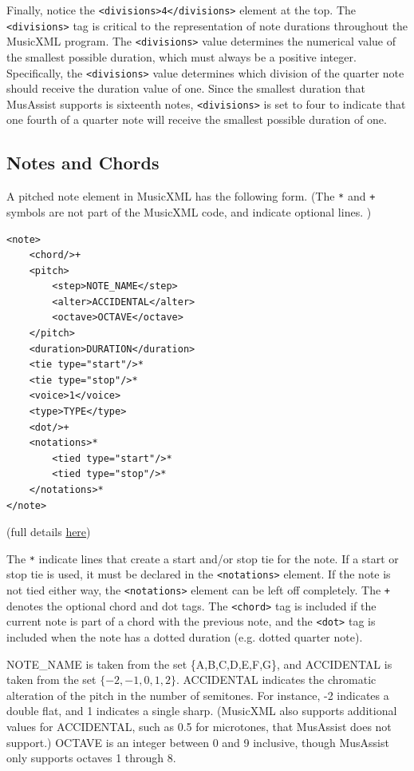 \documentclass{report}
\begin{document}
Finally, notice the \verb.<divisions>4</divisions>. element at the top. The \verb.<divisions>. tag is critical to the representation of note durations throughout the MusicXML program. The \verb.<divisions>. value determines the numerical value of the smallest possible duration, which must always be a positive integer. Specifically, the \verb.<divisions>. value determines which division of the quarter note should receive the duration value of one. Since the smallest duration that MusAssist supports is  sixteenth  notes, \verb.<divisions>. is set to four to indicate that one fourth of a quarter note will receive the smallest possible duration of one.

\subsection{Notes and Chords}
\label{sec:xmlnotes}
A pitched note element in MusicXML has the following form. (The \verb.*. and \verb.+. symbols are not part of the MusicXML code, and indicate optional lines. )

\begin{verbatim}
<note>
    <chord/>+
    <pitch>
        <step>NOTE_NAME</step>
        <alter>ACCIDENTAL</alter>
        <octave>OCTAVE</octave>
    </pitch>
    <duration>DURATION</duration>
    <tie type="start"/>*
    <tie type="stop"/>*
    <voice>1</voice>
    <type>TYPE</type>
    <dot/>+
    <notations>*
        <tied type="start"/>*
        <tied type="stop"/>*
    </notations>*
</note>
\end{verbatim}

\noindent (full details \href{https://www.w3.org/2021/06/musicxml40/musicxml-reference/elements/note/}{here})

The \verb.*. indicate lines that create a start and/or stop tie for the note. If a start or stop tie is used, it must be declared in the \verb.<notations>. element. If the note is not tied either way, the \verb.<notations>. element can be left off completely. The \verb.+. denotes the optional chord and dot tags. The \verb.<chord>. tag is included if the current note is part of a chord with the previous note, and the \verb.<dot>. tag is included when the note has a dotted duration (e.g. dotted quarter note).

NOTE\_NAME is taken from the set \{A,B,C,D,E,F,G\}, and ACCIDENTAL is taken from the set $\{-2,-1,0,1,2\}$. ACCIDENTAL indicates the chromatic alteration of the pitch in the number of semitones. For instance, -2 indicates a double flat, and 1 indicates a single sharp. (MusicXML also supports additional values for ACCIDENTAL, such as 0.5 for microtones, that MusAssist does not support.) OCTAVE is an integer between 0 and 9 inclusive, though MusAssist only supports octaves 1 through 8.
\end{document}
